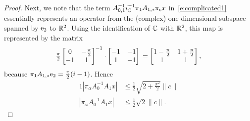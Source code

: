 \begin{proof}
Next, we note that the term $A_{0,1}^{-1}  i_{\mathbb{C}}^{-1} \pi_{1} A_{1,*} \pi_c x $
in~\eqref{e:complicated1} essentially represents an operator from the (complex) one-dimensional subspace spanned by $\mathrm{e}_2$ to $\mathbb{R}^2$. Using the identification of $\mathbb{C}$ with $\mathbb{R}^2$, this map is represented by the matrix 
\[
 \tfrac{\pi}{2} 
 \left[
 \begin{matrix}
 0 & - \tfrac{\pi}{2} \\
 -1  & 1 
 \end{matrix} 
 \right]^{-1}
 \cdot
 \left[
 \begin{matrix}
 -1 & -1 \\
 1 &-1 
 \end{matrix} 
 \right] \\
 =
 \left[
 \begin{matrix}
 1 - \tfrac{\pi}{2} & 1 + \tfrac{\pi}{2} \\
 1  & 1
 \end{matrix} 
 \right] ,
\]
because $\pi_1 A_{1,*} \mathrm{e}_2 = \tfrac{\pi}{2} (i-1)$.
Hence
\begin{alignat*}{1}
  | \pi_\alpha  A_0^{-1} A_1 x |  &\leq  \tfrac{1}{2} \sqrt{ 2 + \tfrac{\pi^2}{2}}  \|c\| \\ 
  | \pi_\omega  A_0^{-1} A_1 x |  &\leq  \tfrac{1}{2}  \sqrt{2} \|c\|  . 
\end{alignat*}

%
%
%
 

\end{proof}
